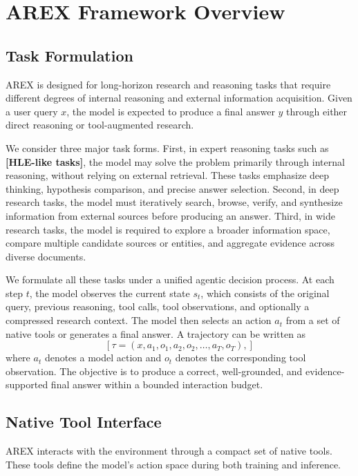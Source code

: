 \documentclass[]{selfevolagent}
\theoremstyle{plain}
\theoremstyle{definition}
\theoremstyle{remark}
\begin{document}
\section{AREX Framework Overview}

\subsection{Task Formulation}

\textsc{AREX} is designed for long-horizon research and reasoning tasks that require different degrees of internal reasoning and external information acquisition. Given a user query $x$, the model is expected to produce a final answer $y$ through either direct reasoning or tool-augmented research.

We consider three major task forms. First, in expert reasoning tasks such as \textbf{[HLE-like tasks]}, the model may solve the problem primarily through internal reasoning, without relying on external retrieval. These tasks emphasize deep thinking, hypothesis comparison, and precise answer selection. Second, in deep research tasks, the model must iteratively search, browse, verify, and synthesize information from external sources before producing an answer. Third, in wide research tasks, the model is required to explore a broader information space, compare multiple candidate sources or entities, and aggregate evidence across diverse documents.

We formulate all these tasks under a unified agentic decision process. At each step $t$, the model observes the current state $s_t$, which consists of the original query, previous reasoning, tool calls, tool observations, and optionally a compressed research context. The model then selects an action $a_t$ from a set of native tools or generates a final answer. A trajectory can be written as
$$
[
\tau = (x, a_1, o_1, a_2, o_2, \ldots, a_T, o_T),
]
$$
where $a_t$ denotes a model action and $o_t$ denotes the corresponding tool observation. The objective is to produce a correct, well-grounded, and evidence-supported final answer within a bounded interaction budget.

\subsection{Native Tool Interface}

\textsc{AREX} interacts with the environment through a compact set of native tools. These tools define the model's action space during both training and inference.
\end{document}
